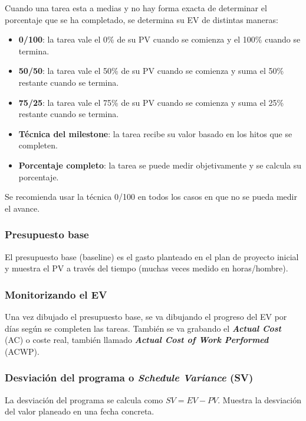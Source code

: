 \documentclass[12pt]{article}
\begin{document}
{Cuando una tarea esta a medias y no hay forma exacta de determinar el porcentaje que se ha completado, se determina su EV de distintas maneras:}

\begin{itemize}
    \item \textbf{0/100}: la tarea vale el 0\% de su PV cuando se comienza y el 100\% cuando se termina.
    \item \textbf{50/50}: la tarea vale el 50\% de su PV cuando se comienza y suma el 50\% restante cuando se termina.
    \item \textbf{75/25}: la tarea vale el 75\% de su PV cuando se comienza y suma el 25\% restante cuando se termina.
    \item \textbf{Técnica del milestone}: la tarea recibe su valor basado en los hitos que se completen.
    \item \textbf{Porcentaje completo}: la tarea se puede medir objetivamente y se calcula su porcentaje.
\end{itemize}

{Se recomienda usar la técnica 0/100 en todos los casos en que no se pueda medir el avance.}

\subsubsection{Presupuesto base}
\label{9.6.1}

{El presupuesto base (baseline) es el gasto planteado en el plan de proyecto inicial y muestra el PV a través del tiempo (muchas veces medido en horas/hombre).}

\subsubsection{Monitorizando el EV}
\label{9.6.2}

{Una vez dibujado el presupuesto base, se va dibujando el progreso del EV por días según se completen las tareas. También se va grabando el \textbf{\textit{Actual Cost}} (AC) o coste real, también llamado \textbf{\textit{Actual Cost of Work Performed}} (ACWP).}

\subsubsection{Desviación del programa o \textit{Schedule Variance} (SV)}
\label{9.6.3}

{La desviación del programa se calcula como $SV = EV - PV$. Muestra la desviación del valor planeado en una fecha concreta.}
\end{document}
